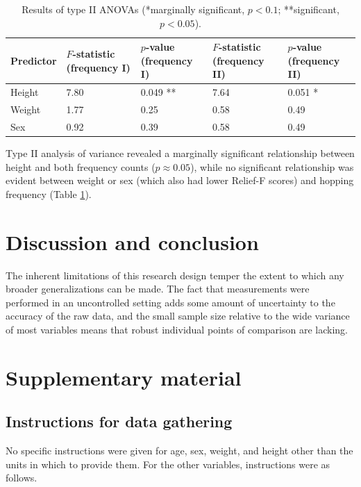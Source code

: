 \documentclass{article}
\begin{document}
\begin{table}[h!]
\centering
\begin{tabular}{@{}lllll@{}}
\toprule
Predictor & $F$-statistic (frequency I) & $p$-value (frequency I) & $F$-statistic (frequency II) & $p$-value (frequency II) \\ \midrule
Height    & 7.80                                   & 0.049 **                                 & 7.64                   & 0.051 *                  \\
Weight    & 1.77                                   & 0.25                                     & 0.58                   & 0.49                     \\
Sex       & 0.92                                   & 0.39                                     & 0.58                   & 0.49                     \\ \bottomrule
\end{tabular}
	\caption{Results of type II ANOVAs (*marginally significant, $p < 0.1$; **significant, $p < 0.05$).}
	\label{fig:anovas}
\end{table}

Type II analysis of variance revealed a marginally significant relationship between height and both frequency counts ($p \approx 0.05$), while no significant relationship was evident between weight or sex (which also had lower Relief-F scores) and hopping frequency (Table \ref{fig:anovas}).

\section{Discussion and conclusion}

The inherent limitations of this research design temper the extent to which any broader generalizations can be made. The fact that measurements were performed in an uncontrolled setting adds some amount of uncertainty to the accuracy of the raw data, and the small sample size relative to the wide variance of most variables means that robust individual points of comparison are lacking. 

\pagebreak
\printbibliography
\pagebreak
\section{Supplementary material}
\subsection{Instructions for data gathering}
No specific instructions were given for age, sex, weight, and height other than the units in which to provide them. For the other variables, instructions were as follows.
\end{document}
